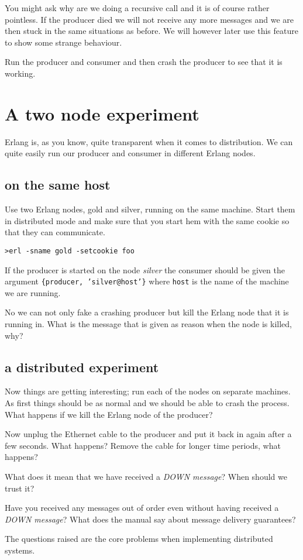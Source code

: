 \documentclass[a4paper, 11pt]{article}
\begin{document}
You might ask why are we doing a recursive call and it is of course
rather pointless. If the producer died we will not receive any more
messages and we are then stuck in the same situations as before. We
will however later use this feature to show some strange behaviour.

Run the producer and consumer and then crash the producer to see that
it is working.

\section{A two node experiment}

Erlang is, as you know, quite transparent when it comes to
distribution. We can quite easily run our producer and consumer in
different Erlang nodes.

\subsection{on the same host}

Use two Erlang nodes, gold and silver, running on the same
machine. Start them in distributed mode and make sure that you start
hem with the same cookie so that they can communicate.

\begin{verbatim}
>erl -sname gold -setcookie foo
\end{verbatim}

If the producer is started on the node {\em silver} the consumer
should be given the argument {\tt \{producer, 'silver@host'\}} where
{\tt host} is the name of the machine we are running. 

No we can not only fake a crashing producer but kill the Erlang
node that it is running in. What is the message that is given as
reason when the node is killed, why?

\subsection{a distributed experiment}

Now things are getting interesting; run each of the nodes on separate
machines. As first things should be as normal and we should be able to
crash the process. What happens if we kill the Erlang node of the producer?

Now unplug the Ethernet cable to the producer and put it back in again
after a few seconds. What happens? Remove the cable for longer time
periods, what happens?

What does it mean that we have received a {\em DOWN message}? When
should we trust it? 

Have you received any messages out of order even without having
received a {\em DOWN message}? What does the manual say about message
delivery guarantees?

The questions raised are the core problems when implementing
distributed systems. 
\end{document}
